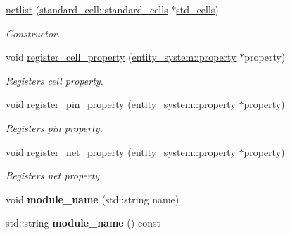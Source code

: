 \begin{DoxyCompactItemize}
\item 
\hyperlink{classophidian_1_1netlist_1_1netlist_aaed1b2653302d1ff92ec1c06f27c3f62}{netlist} (\hyperlink{classophidian_1_1standard__cell_1_1standard__cells}{standard\-\_\-cell\-::standard\-\_\-cells} $\ast$\hyperlink{classophidian_1_1netlist_1_1netlist_a61ec8a8325b9f5d7a476b95cdb2f96c1}{std\-\_\-cells})
\begin{DoxyCompactList}\small\item\em Constructor. \end{DoxyCompactList}\item 
void \hyperlink{classophidian_1_1netlist_1_1netlist_ab48e67163dc06e1b24679b05339e9cd2}{register\-\_\-cell\-\_\-property} (\hyperlink{classophidian_1_1entity__system_1_1property}{entity\-\_\-system\-::property} $\ast$property)
\begin{DoxyCompactList}\small\item\em Registers cell property. \end{DoxyCompactList}\item 
void \hyperlink{classophidian_1_1netlist_1_1netlist_a2c9604efe515a428b20da1d57fd822d7}{register\-\_\-pin\-\_\-property} (\hyperlink{classophidian_1_1entity__system_1_1property}{entity\-\_\-system\-::property} $\ast$property)
\begin{DoxyCompactList}\small\item\em Registers pin property. \end{DoxyCompactList}\item 
void \hyperlink{classophidian_1_1netlist_1_1netlist_ab4564e9687790b9e2a8b50b5ff3cbd14}{register\-\_\-net\-\_\-property} (\hyperlink{classophidian_1_1entity__system_1_1property}{entity\-\_\-system\-::property} $\ast$property)
\begin{DoxyCompactList}\small\item\em Registers net property. \end{DoxyCompactList}\item 
\hypertarget{classophidian_1_1netlist_1_1netlist_a2a425d6fe6441f49f1ca232511c31cbd}{void {\bfseries module\-\_\-name} (std\-::string name)}\label{classophidian_1_1netlist_1_1netlist_a2a425d6fe6441f49f1ca232511c31cbd}

\item 
\hypertarget{classophidian_1_1netlist_1_1netlist_abba837e971c71ddff96b387faf94b5ea}{std\-::string {\bfseries module\-\_\-name} () const }\label{classophidian_1_1netlist_1_1netlist_abba837e971c71ddff96b387faf94b5ea}


\end{DoxyCompactItemize}

